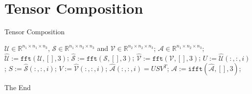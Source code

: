 \documentclass{beamer}
\begin{document}
\section{Tensor Composition}

\begin{frame}{Tensor Composition}
\begin{algorithm}[H] 
\caption{Tensor Composition} 
\label{alg2} 
\begin{algorithmic}[1] 
\Require 
$\mathcal{U} \in \mathbb{R}^{n_1 \times n_1 \times n_3}$, $\mathcal{S} \in \mathbb{R}^{n_1 \times n_2 \times n_3}$ and $\mathcal{V} \in \mathbb{R}^{n_2 \times n_2 \times n_3}$;
\Ensure 
$\mathcal{A} \in \mathbb{R}^{n_1 \times n_2 \times n_3}$; 
\State $\hat{\mathcal{U}}:=\texttt{fft}(\mathcal{U},[],3)$;
\State $\hat{\mathcal{S}}:=\texttt{fft}(\mathcal{S},[],3)$;
\State $\hat{\mathcal{V}}:=\texttt{fft}(\mathcal{V},[],3)$;
\State $U:=\hat{\mathcal{U}}(:,:,i)$;
\State $S:=\hat{\mathcal{S}}(:,:,i)$;
\State $V:=\hat{\mathcal{V}}(:,:,i)$;
\State $\hat{\mathcal{A}}(:,:,i)=USV^T$; 
\EndFor
\State $\mathcal{A} := \texttt{ifft}(\hat{\mathcal{A}},[],3)$;
\end{algorithmic} 
\end{algorithm}
\end{frame}


\begin{frame}
\Huge{\centerline{The End}}
\end{frame}

\end{document}
